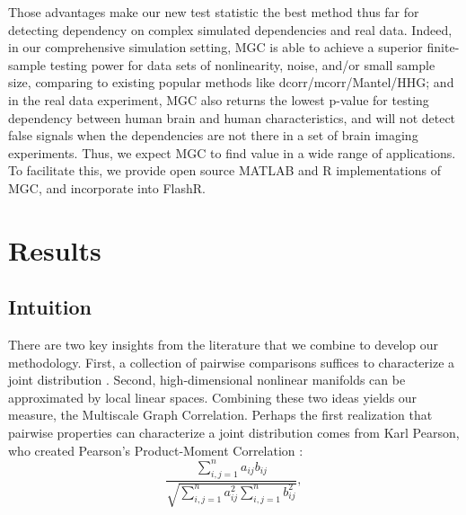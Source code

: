 \documentclass[11pt]{article}
\newcommand{\cs}[1]{{\color{blue}{#1}}}
\begin{document}
Those advantages make our new test statistic the best method thus far for detecting dependency on complex simulated dependencies and real data. Indeed, in our comprehensive simulation setting, MGC is able to achieve a superior finite-sample testing power for data sets of nonlinearity, noise, and/or small sample size, comparing to existing popular methods like dcorr/mcorr/Mantel/HHG; and in the real data experiment, MGC also returns the lowest p-value for testing dependency between human brain and human characteristics,  and will not detect false signals when the dependencies are not there in a set of brain imaging experiments. Thus, we expect MGC to find value in a wide range of applications.  To facilitate this, we provide open source MATLAB and R implementations of MGC, and incorporate into FlashR.

\cs{jovo: send data}


\section{Results}

\subsection{Intuition}

There are two key insights from the literature that we combine to develop our methodology.  First, a collection of pairwise comparisons  suffices to characterize a joint distribution \cite{Maa1996}.  Second, high-dimensional nonlinear manifolds can be approximated by local linear spaces.  Combining these two ideas yields our measure, the Multiscale Graph Correlation.  Perhaps the first realization that pairwise properties can characterize a joint distribution comes from  Karl Pearson, who created Pearson's Product-Moment Correlation \cite{Pearson1895}:
\begin{equation}
\label{generalCoef}
\frac{\sum_{i,j=1}^n a_{ij} b_{ij}}{\sqrt{\sum_{i,j=1}^n  a_{ij}^{2} \sum_{i,j=1}^n b_{ij}^{2}}}, 
\end{equation}
\end{document}
